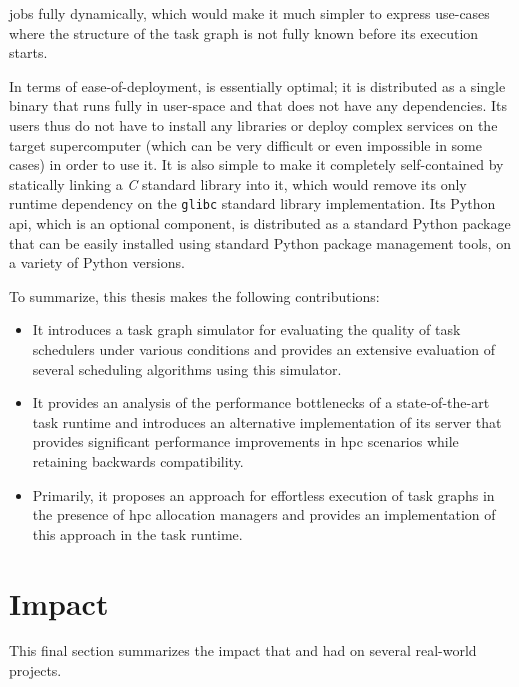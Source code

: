 \begin{description}[wide=0pt]
		jobs fully dynamically, which would make it much simpler to express use-cases where the structure
		of the task graph is not fully known before its execution starts.
	\item[Deployment] In terms of ease-of-deployment, \hyperqueue{} is essentially optimal; it is
		distributed as a single binary that runs fully in user-space and that does not have any
		dependencies. Its users thus do not have to install any libraries or deploy complex services on the
		target supercomputer (which can be very difficult or even impossible in some cases) in order to use
		it. It is also simple to make it completely self-contained by statically linking a
		\emph{C} standard library into it, which would remove its only runtime dependency
		on the \texttt{glibc} standard library implementation. Its Python
		\gls{api}, which is an optional component, is distributed as a standard Python
		package that can be easily installed using standard Python package management tools, on a variety
		of Python versions.
\end{description}

To summarize, this thesis makes the following contributions:
\begin{itemize}
	\item It introduces a task graph simulator for evaluating the quality of task schedulers under various
	      conditions and provides an extensive evaluation of several scheduling algorithms using this
	      simulator.
	\item It provides an analysis of the performance bottlenecks of a state-of-the-art task runtime
	      \dask{} and introduces an alternative implementation of its server that provides
	      significant performance improvements in \gls{hpc} scenarios while retaining
	      backwards compatibility.
	\item Primarily, it proposes an approach for effortless execution of task graphs in the presence of
	      \gls{hpc} allocation managers and provides an implementation of this approach in
	      the \hyperqueue{} task runtime.
\end{itemize}

\section{Impact}
This final section summarizes the impact that \rsds{} and
\hyperqueue{} had on several real-world projects.

